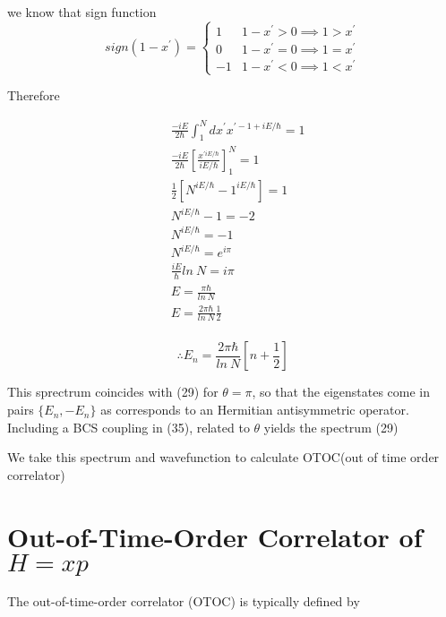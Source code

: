 \documentclass[12pt, letterpaper]{article}
\newcommand*{\1}{\hspace{1pt}}
\begin{document}
        we know that sign function
        \[ sign(1-x^{'}) = \begin{cases} 
            1 & 1-x^{'} > 0  \implies 1 > x^{'} \\
            0 & 1-x^{'} = 0 \implies 1=x^{'} \\
            -1 & 1-x^{'} < 0 \implies 1<x^{'} 
         \end{cases}
      \]

        Therefore

        \begin{align*}
            &\frac{-iE}{2\hbar}\int _{1}^{N} dx^{'} x^{' -1+iE/\hbar} = 1 \\
            &\frac{-iE}{2\hbar} \left[\frac{x^{'iE/\hbar}}{iE/\hbar}\right] _{1} ^{N} = 1 \\
            &\frac{1}{2} \left[N^{iE/\hbar} - 1^{iE/\hbar}\right] = 1 \\
            &N^{iE/\hbar} - 1 = -2 \\ 
            &N^{iE/\hbar} = -1 \\ 
            &N^{iE/\hbar} = e^{i\pi} \\ 
            &\frac{iE}{\hbar}ln\ N = i\pi \\ 
            &E = \frac{\pi\hbar}{ln\ N} \\ 
            &E = \frac{2\pi\hbar}{ln\ N}\frac{1}{2} \\  
        \end{align*}

        \begin{equation}
            \therefore E_{n} = \frac{2\pi\hbar}{ln\ N}\left[n + \frac{1}{2}\right] 
        \end{equation}

        This sprectrum coincides with (29) for $\theta=\pi$, so that the eigenstates come in pairs $\{E_{n}, -E_{n}\}$ as corresponds to an Hermitian antisymmetric
        operator. Including a BCS coupling in (35), related to $\theta$ yields the spectrum (29)\cite{s9}

        We take this spectrum and wavefunction to calculate OTOC(out of time order correlator)

    \section{Out-of-Time-Order Correlator of $H=xp$}
        
        The out-of-time-order correlator (OTOC) is typically defined by \cite{s11}
\end{document}
